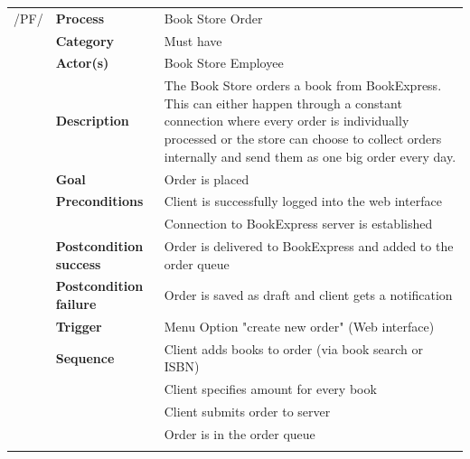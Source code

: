 \documentclass[11pt,a4paper,oneside,svgnames]{report}
\begin{document}
\noindent
\begin{tabular}{p{1.5cm}p{3cm}p{8cm}}
/PF/	& \textbf{Process} & Book Store Order\\ 
		& \textbf{Category} & Must have\\
		& \textbf{Actor(s)} & Book Store Employee\\ 
		& \textbf{Description}	 & The Book Store orders a book from BookExpress.
This can either happen through a constant connection where every order is individually processed or the store can choose to collect orders internally and send them
as one big order every day.\\ 
		& \textbf{Goal} & Order is placed\\
		& \textbf{Preconditions} & Client is successfully logged into the web interface\\
		& & Connection to BookExpress server is established\\
		& \textbf{Postcondition success} & Order is delivered to BookExpress  and added to the order queue\\
		& \textbf{Postcondition failure} & Order is saved as draft and client gets a notification\\
		& \textbf{Trigger} & Menu Option "create new order" (Web interface)\\
		& \textbf{Sequence} & Client adds books to order (via book search or ISBN)\\
		& & Client specifies amount for every book\\
		& & Client submits order to server\\
		& & Order is in the order queue\\
\hfill \\
\end{tabular}
\end{document}

